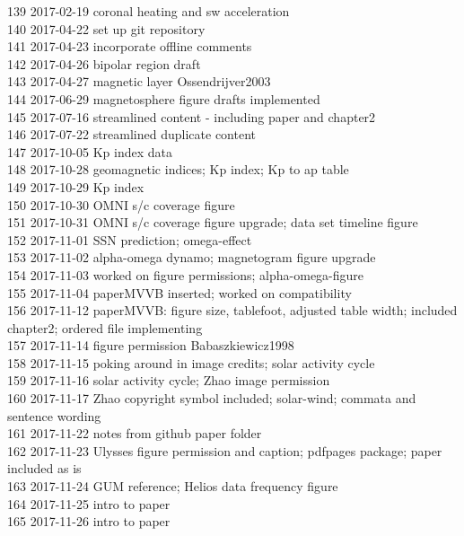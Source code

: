 \begin{footnotesize}
139	2017-02-19	coronal heating and sw acceleration\\
140	2017-04-22	set up git repository\\
141	2017-04-23	incorporate offline comments\\
142	2017-04-26	bipolar region draft\\
143	2017-04-27	magnetic layer Ossendrijver2003\\
144	2017-06-29	magnetosphere figure drafts implemented\\
145	2017-07-16	streamlined content - including paper and chapter2\\
146	2017-07-22	streamlined duplicate content\\
147	2017-10-05	Kp index data\\
148	2017-10-28	geomagnetic indices; Kp index; Kp to ap table\\
149	2017-10-29	Kp index\\
150	2017-10-30	OMNI s/c coverage figure\\
151	2017-10-31	OMNI s/c coverage figure upgrade; data set timeline figure\\
152	2017-11-01	SSN prediction; omega-effect\\
153	2017-11-02	alpha-omega dynamo; magnetogram figure upgrade\\
154	2017-11-03	worked on figure permissions; alpha-omega-figure\\
155	2017-11-04	paperMVVB inserted; worked on compatibility\\
156	2017-11-12	paperMVVB: figure size, tablefoot, adjusted table width; included chapter2; ordered file implementing\\
157	2017-11-14	figure permission Babaszkiewicz1998\\
158	2017-11-15	poking around in image credits; solar activity cycle\\
159	2017-11-16	solar activity cycle; Zhao image permission\\
160	2017-11-17	Zhao copyright symbol included; solar-wind; commata and sentence wording\\
161	2017-11-22	notes from github paper folder\\
162	2017-11-23	Ulysses figure permission and caption; pdfpages package; paper included as is\\
163	2017-11-24	GUM reference; Helios data frequency figure\\
164	2017-11-25	intro to paper\\
165	2017-11-26	intro to paper\\

\end{footnotesize}

